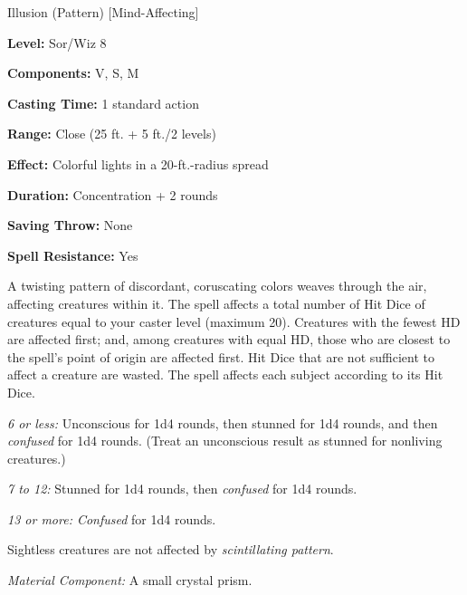 
Illusion (Pattern) [Mind-Affecting]

\textbf{Level:} Sor/Wiz 8

\textbf{Components:} V, S, M

\textbf{Casting Time:} 1 standard action

\textbf{Range:} Close (25 ft. + 5 ft./2 levels)

\textbf{Effect:} Colorful lights in a 20-ft.-radius spread

\textbf{Duration:} Concentration + 2 rounds

\textbf{Saving Throw:} None

\textbf{Spell Resistance:} Yes

A twisting pattern of discordant, coruscating colors weaves through the air, affecting 
creatures within it. The spell affects a total number of Hit Dice of creatures 
equal to your caster level (maximum 20). Creatures with the fewest HD are affected 
first; and, among creatures with equal HD, those who are closest to the spell's 
point of origin are affected first. Hit Dice that are not sufficient to affect 
a creature are wasted. The spell affects each subject according to its Hit Dice.

\textit{6 or less:} Unconscious for 1d4 rounds, then stunned for 1d4 rounds, and 
then \textit{confused} for 1d4 rounds. (Treat an unconscious result as stunned 
for nonliving creatures.)

\textit{7 to 12:} Stunned for 1d4 rounds, then \textit{confused} for 1d4 rounds. 

\textit{13 or more: Confused} for 1d4 rounds. 

Sightless creatures are not affected by \textit{scintillating pattern}.

\textit{Material Component:} A small crystal prism.

